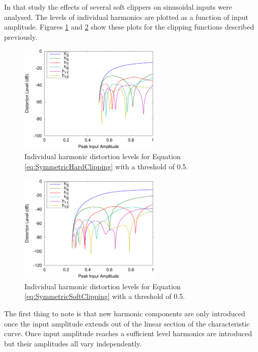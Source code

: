 			In that study the effects of several soft clippers on sinusoidal inputs were analysed. The levels
			of individual harmonics are plotted as a function of input amplitude. Figures
			\ref{fig:HardClippingHarmonics} and \ref{fig:SoftClippingHarmonics} show these plots for the
			clipping functions described previously.

			\begin{figure}[h!]
				\centering
				\includegraphics[width=0.6\textwidth]{chapter3/Images/HardClippingHarmonics.eps}
				\caption{Individual harmonic distortion levels for Equation \ref{eq:SymmetricHardClipping}
					 with a threshold of 0.5.}
				\label{fig:HardClippingHarmonics}
			\end{figure}

			\begin{figure}[h!]
				\centering
				\includegraphics[width=0.6\textwidth]{chapter3/Images/SoftClippingHarmonics.eps}
				\caption{Individual harmonic distortion levels for Equation \ref{eq:SymmetricSoftClipping}
					 with a threshold of 0.5.}
				\label{fig:SoftClippingHarmonics}
			\end{figure}

			The first thing to note is that new harmonic components are only introduced once the input
			amplitude extends out of the linear section of the characteristic curve. Once input amplitude
			reaches a sufficient level harmonics are introduced but their amplitudes all vary independently.

